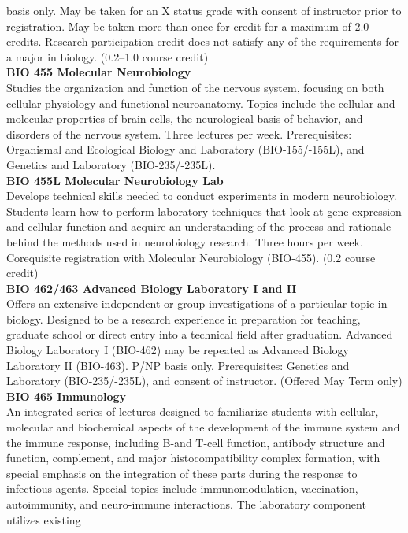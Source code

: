 \documentclass[
  letterpaper,
]{scrbook}
\begin{document}
basis only. May be taken for an X status grade with consent of
instructor prior to registration. May be taken more than once for credit
for a maximum of 2.0 credits. Research participation credit does not
satisfy any of the requirements for a major in biology. (0.2--1.0 course
credit)\\
\textbf{BIO 455 Molecular Neurobiology}\\
Studies the organization and function of the nervous system, focusing on
both cellular physiology and functional neuroanatomy. Topics include the
cellular and molecular properties of brain cells, the neurological basis
of behavior, and disorders of the nervous system. Three lectures per
week. Prerequisites: Organismal and Ecological Biology and Laboratory
(BIO-155/-155L), and Genetics and Laboratory (BIO-235/-235L).\\
\textbf{BIO 455L Molecular Neurobiology Lab}\\
Develops technical skills needed to conduct experiments in modern
neurobiology. Students learn how to perform laboratory techniques that
look at gene expression and cellular function and acquire an
understanding of the process and rationale behind the methods used in
neurobiology research. Three hours per week. Corequisite registration
with Molecular Neurobiology (BIO-455). (0.2 course credit)\\
\textbf{BIO 462/463 Advanced Biology Laboratory I and II}\\
Offers an extensive independent or group investigations of a particular
topic in biology. Designed to be a research experience in preparation
for teaching, graduate school or direct entry into a technical field
after graduation. Advanced Biology Laboratory I (BIO-462) may be
repeated as Advanced Biology Laboratory II (BIO-463). P/NP basis only.
Prerequisites: Genetics and Laboratory (BIO-235/-235L), and consent of
instructor. (Offered May Term only)\\
\textbf{BIO 465 Immunology}\\
An integrated series of lectures designed to familiarize students with
cellular, molecular and biochemical aspects of the development of the
immune system and the immune response, including B-and T-cell function,
antibody structure and function, complement, and major
histocompatibility complex formation, with special emphasis on the
integration of these parts during the response to infectious agents.
Special topics include immunomodulation, vaccination, autoimmunity, and
neuro-immune interactions. The laboratory component utilizes existing
\end{document}
